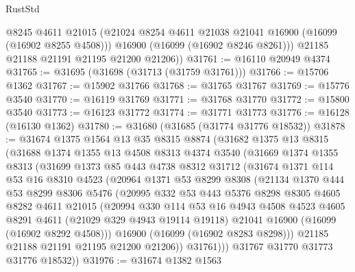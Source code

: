 \begin{lexlean}{RustStd}
\begin{coremodule}
          @8245
          @4611
          @21015
          (@21024 @8254 @4611 @21038 @21041 @16900 (@16099 (@16902 @8255 @4508)))
          @16900
          (@16099 (@16902 @8246 @8261)))
        @21185
        @21188
        @21191
        @21195
        @21200
        @21206))
@31761 := @16110 @20949 @4374
@31765 := @31695 (@31698 (@31713 (@31759 @31761)))
@31766 := @15706 @1362
@31767 := @15902 @31766
@31768 := @31765 @31767
@31769 := @15776 @3540
@31770 := @16119 @31769
@31771 := @31768 @31770
@31772 := @15800 @3540
@31773 := @16123 @31772
@31774 := @31771 @31773
@31776 := @16128 (@16130 @1362)
@31780 := @31680 (@31685 (@31774 @31776 @18532))
@31878 := @31674
    @1375
    @1564
    @13
    @35
    @8315
    @8874
    (@31682
      @1375
      @13
      @8315
      (@31688
        @1374
        @1355
        @13
        @4508
        @8313
        @4374
        @3540
        (@31669
          @1374
          @1355
          @8313
          (@31699
            @1373
            @85
            @443
            @4738
            @8312
            @31712
            (@31674
              @1371
              @114
              @53
              @16
              @8310
              @4523
              (@20964
                @1371
                @53
                @8299
                @8308
                (@21134
                  @1370
                  @444
                  @53
                  @8299
                  @8306
                  @5476
                  (@20995
                    @332
                    @53
                    @443
                    @5376
                    @8298
                    @8305
                    @4605
                    @8282
                    @4611
                    @21015
                    (@20994
                      @330
                      @114
                      @53
                      @16
                      @4943
                      @4508
                      @4523
                      @4605
                      @8291
                      @4611
                      (@21029 @329 @4943 @19114 @19118)
                      @21041
                      @16900
                      (@16099 (@16902 @8292 @4508)))
                    @16900
                    (@16099 (@16902 @8283 @8298)))
                  @21185
                  @21188
                  @21191
                  @21195
                  @21200
                  @21206))
              @31761)))
        @31767
        @31770
        @31773
        @31776
        @18532))
@31976 := @31674
    @1382
    @1563

\end{coremodule}
\end{lexlean}
